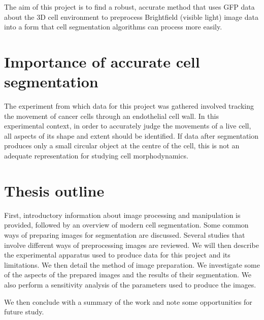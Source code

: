 The aim of this project is to find a robust, accurate method that uses GFP data about the 3D cell environment to preprocess Brightfield (visible light) image data into a form that cell segmentation algorithms can process more easily.

\section{Importance of accurate cell segmentation} %
\label{section1.2}

The experiment from which data for this project was gathered involved tracking the movement of cancer cells through an endothelial cell wall. In this experimental context, in order to accurately judge the movements of a live cell, all aspects of its shape and extent should be identified. If data after segmentation produces only a small circular object at the centre of the cell, this is not an adequate representation for studying cell morphodynamics.

\section{Thesis outline}  %
\label{section1.3}

First, introductory information about image processing and manipulation is provided, followed by an overview of modern cell segmentation. Some common ways of preparing images for segmentation are discussed. Several studies that involve different ways of preprocessing images are reviewed. We will then describe the experimental apparatus used to produce data for this project and its limitations.
We then detail the method of image preparation. We investigate some of the aspects of the prepared images and the results of their segmentation. We also perform a sensitivity analysis of the parameters used to produce the images.

We then conclude with a summary of the work and note some opportunities for future study.
